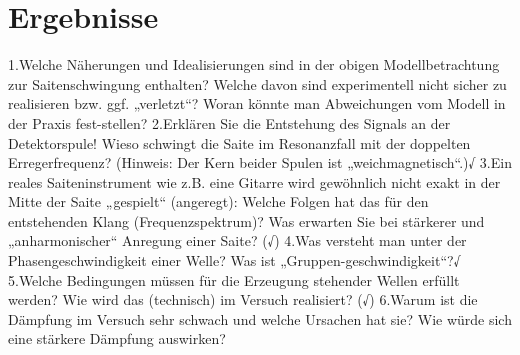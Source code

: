 \documentclass[a4paper,twocolumn]{scrartcl}
\begin{document}
\section*{Ergebnisse}



















1.Welche  Näherungen  und  Idealisierungen  sind  in  der  obigen  Modellbetrachtung  zur Saitenschwingung enthalten? Welche davon sind experimentell nicht sicher zu realisieren bzw.  ggf.  „verletzt“?  Woran  könnte  man  Abweichungen  vom  Modell  in  der  Praxis  fest-stellen?
2.Erklären Sie die Entstehung des Signals an der Detektorspule! Wieso schwingt die Saite im  Resonanzfall  mit  der  doppelten  Erregerfrequenz? (Hinweis:  Der  Kern  beider  Spulen ist „weichmagnetisch“.)√
3.Ein  reales  Saiteninstrument  wie  z.B.  eine  Gitarre  wird  gewöhnlich  nicht  exakt  in  der Mitte der Saite „gespielt“ (angeregt): Welche Folgen hat das für den entstehenden Klang (Frequenzspektrum)?  Was  erwarten  Sie  bei  stärkerer und  „anharmonischer“  Anregung einer Saite? (√)
4.Was  versteht  man  unter  der  Phasengeschwindigkeit  einer  Welle?  Was  ist  „Gruppen-geschwindigkeit“?√
5.Welche  Bedingungen  müssen  für  die  Erzeugung  stehender  Wellen  erfüllt  werden?  Wie wird das (technisch) im Versuch realisiert? (√)
6.Warum  ist  die  Dämpfung  im  Versuch  sehr  schwach  und welche  Ursachen  hat  sie?  Wie würde sich eine stärkere Dämpfung auswirken?

	
\end{document}

